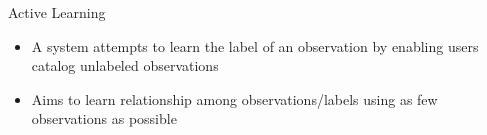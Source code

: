\begin{frame}{Active Learning}
    \begin{itemize}
        \item A system attempts to learn the label of an observation by enabling users catalog unlabeled observations \cite{report:active-learning}
        \item Aims to learn relationship among observations/labels using as few observations as possible
    \end{itemize}
\end{frame}


